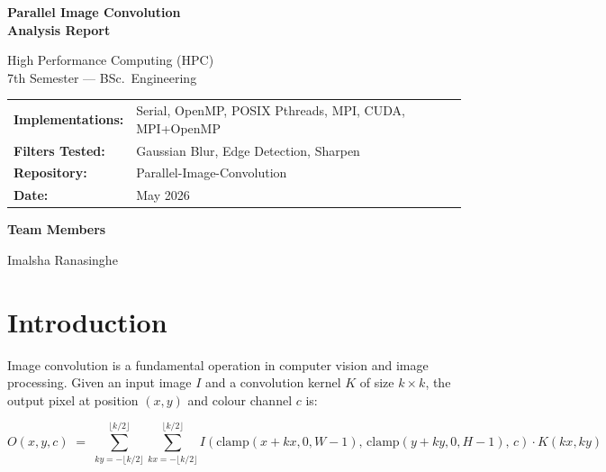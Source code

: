 \documentclass[12pt,a4paper]{article}
\begin{document}
\begin{titlepage}
  \centering
  \vspace*{2cm}
  {\Huge\bfseries Parallel Image Convolution\\[0.4em]
   \Large Analysis Report\par}
  \vspace{1.5cm}
  {\large High Performance Computing (HPC)\\[0.3em]
   7th Semester --- BSc.\ Engineering\par}
  \vspace{2cm}
  \begin{tabular}{ll}
    \textbf{Implementations:} & Serial, OpenMP, POSIX Pthreads, MPI, CUDA, MPI+OpenMP \\[4pt]
    \textbf{Filters Tested:}  & Gaussian Blur, Edge Detection, Sharpen \\[4pt]
    \textbf{Repository:}      & Parallel-Image-Convolution \\[4pt]
    \textbf{Date:}            & May 2026 \\
  \end{tabular}
  \vfill
  {\large\bfseries Team Members\par}
  \vspace{0.5cm}
  Imalsha Ranasinghe\\
\end{titlepage}

\tableofcontents
\newpage

\section{Introduction}

Image convolution is a fundamental operation in computer vision and image
processing. Given an input image $I$ and a convolution kernel $K$ of size
$k \times k$, the output pixel at position $(x,y)$ and colour channel $c$ is:

\begin{equation}
  O(x,y,c) \;=\;
  \sum_{ky=-\lfloor k/2\rfloor}^{\lfloor k/2\rfloor}
  \sum_{kx=-\lfloor k/2\rfloor}^{\lfloor k/2\rfloor}
  I\!\left(\text{clamp}(x+kx,0,W{-}1),\,
           \text{clamp}(y+ky,0,H{-}1),\,c\right)
  \cdot K(kx,ky)
  \label{eq:conv}
\end{equation}
\end{document}

